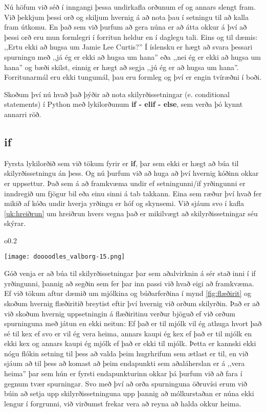 Nú höfum við séð í inngangi þessa undirkafla orðunum ef og annars slengt fram.
Við þekkjum þessi orð og skiljum hvernig á að nota þau í setningu til að kalla fram útkomu.
En það sem við þurfum að gera núna er að átta okkur á því að þessi orð eru mun formlegri í forritun heldur en í daglegu tali.
Eins og til dæmis: ,,Ertu ekki að hugsa um Jamie Lee Curtis?''
Í íslensku er hægt að svara þessari spurningu með ,,já ég er ekki að hugsa um hana'' eða ,,nei ég er ekki að hugsa um hana'' og bæði skilst, einnig er hægt að segja ,,jú ég er að hugsa um hana''.
Forritunarmál eru ekki tungumál, þau eru formleg og því er engin tvíræðni í boði.

Skoðum því nú hvað það þýðir að nota skilyrðissetningar (e. conditional statements) í Python með lykilorðunum \textbf{if - elif - else}, sem verða þó kynnt annarri röð.

\subsection{if}
Fyrsta lykilorðið sem við tökum fyrir er \textbf{if}, þar sem ekki er hægt að búa til skilyrðissetningu án þess.
Og nú þurfum við að huga að því hvernig kóðinn okkar er uppsettur.
Það sem á að framkvæma undir ef setningunni/if yrðingunni er inndregið um fjögur bil eða einu sinni á tab takkann.
Eina sem ræður því hvað fer mikið af kóða undir hverja yrðingu er hóf og skynsemi.
Við sjáum svo í kafla \ref{uk:hreiðrun} um hreiðrun hvers vegna það er mikilvægt að skilyrðissetningar séu skýrar.
\begin{wrapfigure}{o}{0.2\textwidth} %
	\begin{center}
		\texttt{[image: doooodles\_valborg-15.png]}
	\end{center}
\end{wrapfigure}
Góð venja er að búa til skilyrðissetningar þar sem aðalvirknin á sér stað inni í if yrðingunni, þannig að segðin sem fer þar inn passi við hvað eigi að framkvæma.
Ef við tökum aftur dæmið um mjólkina og búðarferðina í mynd \ref{fig:flæðirit} og skoðum hvernig flæðiritið breytist eftir því hvernig við orðum skilyrðin.
Það er að við skoðum hvernig uppsetningin á flæðiritinu verður bjöguð ef við orðum spurninguna með játun en ekki neitun: Ef það er til mjólk vil ég athuga hvort það sé til kex ef svo er vil ég vera heima, annars kaupi ég kex ef það er til mjólk en ekki kex og annars kaupi ég mjólk ef það er ekki til mjólk.
Þetta er kannski ekki nógu flókin setning til þess að valda þeim hugrhrifum sem ætlast er til, en við sjáum að til þess að komast að þeim endapunkti sem aðaláherslan er á ,,vera heima'' þar sem hún er fyrsti endapunkturinn okkar þá þurfum við að fara í gegnum tvær spurningar.
Svo með því að orða spurninguna öðruvísi erum við búin að setja upp skilyrðissetninguna upp þannig að mólkurstaðan er núna ekki lengur í forgrunni, við virðumst frekar vera að reyna að halda okkur heima.

